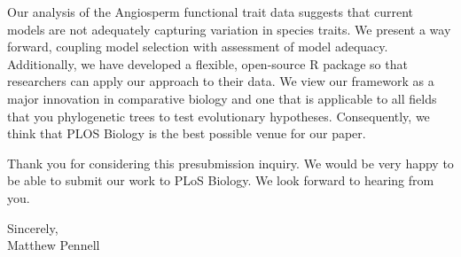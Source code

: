 \documentclass[a4paper,12pt]{article}
\begin{document}
Our analysis of the Angiosperm functional trait data suggests that current models are not adequately capturing variation in species traits. We present a way forward, coupling model selection with assessment of model adequacy. Additionally, we have developed a flexible, open-source R package so that researchers can apply our approach to their data. We view our framework as a major innovation in comparative biology and one that is applicable to all fields that you phylogenetic trees to test evolutionary hypotheses. Consequently, we think that PLOS Biology is the best possible venue for our paper. 

Thank you for considering this presubmission inquiry. We would be very happy to be able to submit our work to PLoS Biology. We look forward to hearing from you.

\begin{flushright}
\vspace{2ex}
\hspace{.2\textwidth}Sincerely,\\
\hspace*{.3\textwidth}
Matthew Pennell
\end{flushright}



\end{document}
